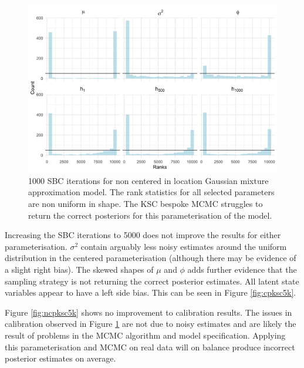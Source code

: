 \documentclass[12pt, a4paper]{article}
\begin{document}
    \begin{figure}[H]
        \centering
        \includegraphics[scale=0.1]{results/ksc_ncp_1k.png}
        \caption{1000 SBC iterations for non centered in location Gaussian mixture approximation model. The rank statistics for all selected parameters are non uniform in shape. The KSC bespoke MCMC struggles to return the correct posteriors for this parameterisation of the model.}
        \label{fig:ncpksc1k}
    \end{figure}

    Increasing the SBC iterations to 5000 does not improve the results for either parameterisation. $\sigma^2$ contain arguably less noisy estimates around the uniform distribution in the centered parameterisation (although there may be evidence of a slight right bias). The skewed shapes of $\mu$ and $\phi$ adds further evidence that the sampling strategy is not returning the correct posterior estimates. All latent state variables appear to have a left side bias. This can be seen in Figure \ref{fig:cpksc5k}.

    Figure \ref{fig:ncpksc5k} shows no improvement to calibration results. The issues in calibration observed in Figure \ref{fig:ncpksc1k} are not due to noisy estimates and are likely the result of problems in the MCMC algorithm and model specification. Applying this parameterisation and MCMC on real data will on balance produce incorrect posterior estimates on average. 
\end{document}
